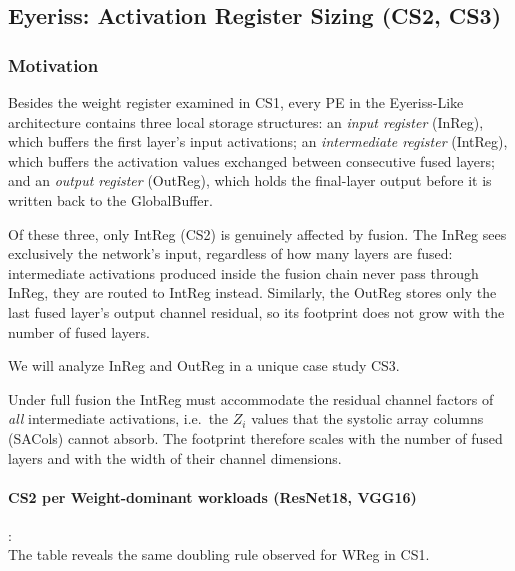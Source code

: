 \subsection{Eyeriss: Activation Register Sizing (CS2, CS3)}
\label{sec:eyeriss-cs2-cs3}

\subsubsection{Motivation}

Besides the weight register examined in CS1, every PE in the
Eyeriss-Like architecture contains three local storage
structures: an \emph{input register} (InReg), which buffers the
first layer's input activations; an \emph{intermediate register}
(IntReg), which buffers the activation values exchanged between
consecutive fused layers; and an \emph{output register} (OutReg),
which holds the final-layer output before it is written back to the
GlobalBuffer.

Of these three, only IntReg (CS2) is genuinely affected by fusion.
The InReg sees exclusively the network's input, regardless of how
many layers are fused: intermediate activations produced inside the
fusion chain never pass through InReg, they are routed to IntReg
instead.
Similarly, the OutReg stores only the last fused layer's output
channel residual, so its footprint does not grow with the number of
fused layers.

We will analyze InReg and OutReg in a unique case study CS3.

Under full fusion the IntReg must accommodate the residual channel
factors of \emph{all} intermediate activations, i.e.\ the $Z_i$
values that the systolic array columns (SACols) cannot absorb.
The footprint therefore scales with the number of fused layers and
with the width of their channel dimensions.


\label{sec:eyeriss-cs2}

\paragraph{CS2 per Weight-dominant workloads (ResNet18, VGG16)}: \\



The table reveals the same doubling rule observed for WReg in CS1.


